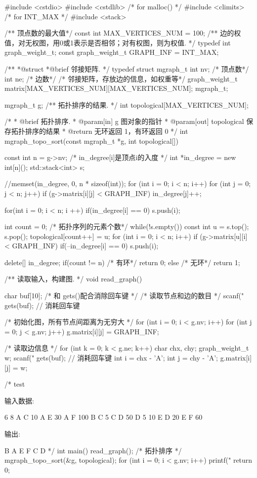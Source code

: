 \begin{Codex}[label=mgraph_topo_sort.c]
#include <cstdio>
#include <cstdlib>  /* for malloc() */
#include <climits>  /* for INT_MAX */
#include <stack>

/** 顶点数的最大值*/
const int MAX_VERTICES_NUM = 100;
/** 边的权值，对无权图，用0或1表示是否相邻；对有权图，则为权值. */
typedef int graph_weight_t;
const graph_weight_t GRAPH_INF = INT_MAX;

/**
 *@struct
 *@brief 邻接矩阵.
 */
typedef struct mgraph_t {
    int nv; /* 顶点数*/
    int ne; /* 边数*/
    /* 邻接矩阵，存放边的信息，如权重等*/
    graph_weight_t matrix[MAX_VERTICES_NUM][MAX_VERTICES_NUM];
} mgraph_t;

mgraph_t g;
/** 拓扑排序的结果. */
int topological[MAX_VERTICES_NUM];

/*
  * @brief 拓扑排序.
  * @param[in] g 图对象的指针
  * @param[out] topological 保存拓扑排序的结果
  * @return 无环返回 1，有环返回 0
  */
int mgraph_topo_sort(const mgraph_t *g, int topological[]) {
    const int n = g->nv;
    /* in_degree[i]是顶点i的入度 */
    int *in_degree = new int[n]();
    std::stack<int> s;

    //memset(in_degree, 0, n * sizeof(int));
    for (int i = 0; i < n; i++) {
        for (int j = 0; j < n; j++) {
            if (g->matrix[i][j] < GRAPH_INF)
                in_degree[j]++;
        }
    }

    for(int i = 0; i < n; i ++) {
        if(in_degree[i] == 0)
            s.push(i);
    }

    int count = 0; /* 拓扑序列的元素个数*/
    while(!s.empty()) {
        const int u = s.top(); s.pop();
        topological[count++] = u;
        for (int i = 0; i < n; i++) if (g->matrix[u][i] < GRAPH_INF) {
            if(--in_degree[i] == 0) s.push(i);
        }
    }

    delete[] in_degree;
    if(count != n) { /* 有环*/
        return 0;
    } else { /* 无环*/
        return 1;
    }
}

/** 读取输入，构建图. */
void read_graph() {
    char buf[10]; /* 和 gets()配合消除回车键 */
    /* 读取节点和边的数目 */
    scanf("%
    gets(buf); // 消耗回车键

    /* 初始化图，所有节点间距离为无穷大 */
    for (int i = 0; i < g.nv; i++) {
        for (int j = 0; j < g.nv; j++) {
            g.matrix[i][j] = GRAPH_INF;
        }
    }

    /* 读取边信息 */
    for (int k = 0; k < g.ne; k++) {
        char chx, chy;
        graph_weight_t w;
        scanf("%
        gets(buf); // 消耗回车键
        int i = chx - 'A';
        int j = chy - 'A';
        g.matrix[i][j] = w;
    }
}

/* test

输入数据:

6 8
A C 10
A E 30
A F 100
B C 5
C D 50
D 5 10
E D 20
E F 60

输出:

B A E F C D
*/
int main() {
    read_graph();
    /* 拓扑排序 */
    mgraph_topo_sort(&g, topological);
    for (int i = 0; i < g.nv; i++) {
        printf("%
    }
    return 0;
}
\end{Codex}

